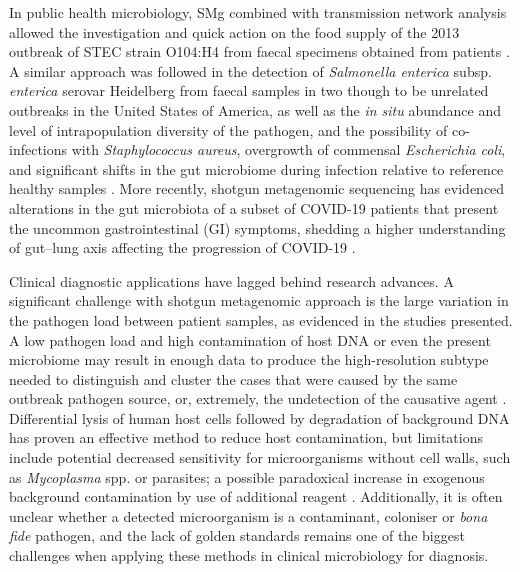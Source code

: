 In public health microbiology, \ac{SMg} combined with transmission network analysis allowed the investigation and quick action on the food supply of the 2013 outbreak of \ac{STEC} strain O104:H4 from faecal specimens obtained from patients \citep{loman_culture-independent_2013}. A similar approach was followed in the detection of \textit{Salmonella enterica} subsp. \textit{enterica} serovar Heidelberg from faecal samples in two though to be unrelated outbreaks in the United States of America, as well as the \textit{in situ} abundance and level of intrapopulation diversity of the pathogen, and the possibility of co-infections with \textit{Staphylococcus aureus}, overgrowth of commensal \textit{Escherichia coli}, and significant shifts in the gut microbiome during infection relative to reference healthy samples \citep{huang_metagenomics_2017}. More recently, shotgun metagenomic sequencing has evidenced alterations in the gut microbiota of a subset of COVID-19 patients that present the uncommon gastrointestinal (GI) symptoms, shedding a higher understanding of gut–lung axis affecting the progression of COVID-19 \citep{li_microbiome_2021}.

Clinical diagnostic applications have lagged behind research advances. A significant challenge with shotgun metagenomic approach is the large variation in the pathogen load between patient samples, as evidenced in the studies presented. A low pathogen load and  high contamination of host DNA or even the present microbiome may result in enough data to produce the high-resolution subtype needed to distinguish and cluster the cases that were caused by the same outbreak pathogen source, or, extremely, the undetection of the causative agent \citep{carleton_metagenomic_2019, chiu_clinical_2019}. Differential lysis of human host cells followed by degradation of background DNA has proven an effective method to reduce host contamination, but limitations include potential decreased sensitivity for microorganisms without cell walls, such as \textit{Mycoplasma} spp. or parasites; a possible paradoxical increase in exogenous background contamination by use of additional reagent \citep{salter_reagent_2014, oneil_ribosomal_2013, feehery_method_2013}. Additionally, it is often unclear whether a detected microorganism is a contaminant, coloniser or \textit{bona fide} pathogen, and the lack of golden standards remains one of the biggest challenges when applying these methods in clinical microbiology for diagnosis. 

